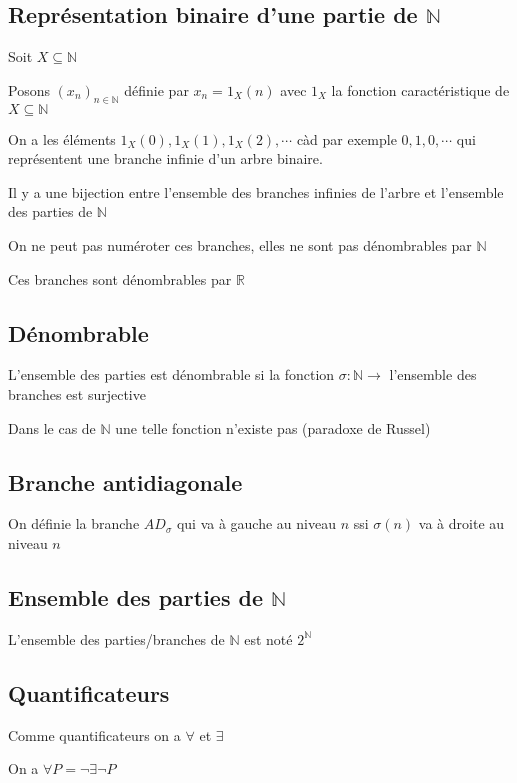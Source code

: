 \documentclass[a4paper,10pt]{article}
\newcommand{\ap}{\rightarrow}
\newcommand{\R}{\mathbb{R}}
\newcommand{\N}{\mathbb{N}}
\begin{document}
\subsection{Représentation binaire d'une partie de $\N$}

Soit $X \subseteq \N$
 
Posons $(x_n)_{n \in \N}$ définie par $x_n = 1_X(n)$ avec $1_X$ la fonction caractéristique de $X \subseteq \N$

On a les éléments $1_X(0),1_X(1),1_X(2),\cdots$ càd par exemple $0,1,0,\cdots$ qui représentent une branche infinie d'un arbre binaire.

Il y a une bijection entre l'ensemble des branches infinies de l'arbre et l'ensemble des parties de $\N$

On ne peut pas numéroter ces branches, elles ne sont pas dénombrables par $\N$

Ces branches sont dénombrables par $\R$

\subsection{Dénombrable}

L'ensemble des parties est dénombrable si la fonction $\sigma : \N \ap$ l'ensemble des branches est surjective

Dans le cas de $\N$ une telle fonction n'existe pas (paradoxe de Russel)

\subsection{Branche antidiagonale}

On définie la branche $AD_\sigma$ qui va à gauche au niveau $n$ ssi $\sigma(n)$ va à droite au niveau $n$

\subsection{Ensemble des parties de $\N$}


L'ensemble des parties/branches de $\N$ est noté $2^\N$

\subsection{Quantificateurs}

Comme quantificateurs on a $\forall$ et $\exists$

On a $\forall P = \neg \exists \neg P$
\end{document}
